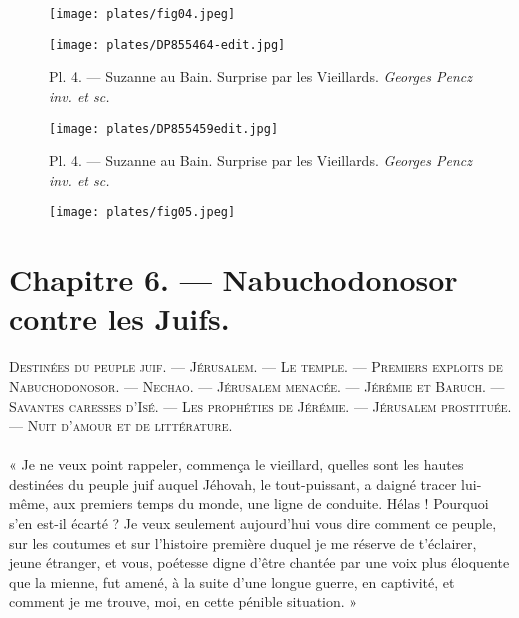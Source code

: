\documentclass[a4paper, 11pt, oneside, polutonikogreek, french]{article}
\begin{document}
\begin{figure}[H]
\centering
\texttt{[image: plates/fig04.jpeg]}
\end{figure}
\clearpage
\vspace*{\fill}
\begin{figure}[H]
\centering
\texttt{[image: plates/DP855464-edit.jpg]}
\caption{Pl. 4. --- Suzanne au Bain. Surprise par les Vieillards. \emph{Georges Pencz inv. et sc.}}
\end{figure}
\vspace*{\fill}
\begin{figure}[H]
\centering
\texttt{[image: plates/DP855459edit.jpg]}
\caption{Pl. 4. --- Suzanne au Bain. Surprise par les Vieillards. \emph{Georges Pencz inv. et sc.}}
\end{figure}
\vspace*{\fill}
\clearpage
\begin{figure}[H]
\centering
\texttt{[image: plates/fig05.jpeg]}
\end{figure}
\section{Chapitre 6. --- Nabuchodonosor contre les Juifs.}
\begin{center}
\scshape
\small
Destinées du peuple juif. --- Jérusalem. --- Le temple. --- Premiers exploits de Nabuchodonosor. --- Nechao. --- Jérusalem menacée. --- Jérémie et Baruch. --- Savantes caresses d'Isé. --- Les prophéties de Jérémie. --- Jérusalem prostituée. --- Nuit d'amour et de littérature.
\end{center}
\paragraph{}
« Je ne veux point rappeler, commença le vieillard, quelles sont les hautes destinées du peuple juif auquel Jéhovah, le tout-puissant, a daigné tracer lui-même, aux premiers temps du monde, une ligne de conduite. Hélas ! Pourquoi s'en est-il écarté ? Je veux seulement aujourd'hui vous dire comment ce peuple, sur les coutumes et sur l'histoire première duquel je me réserve de t'éclairer, jeune étranger, et vous, poétesse digne d'être chantée par une voix plus éloquente que la mienne, fut amené, à la suite d'une longue guerre, en captivité, et comment je me trouve, moi, en cette pénible situation. »
\end{document}
